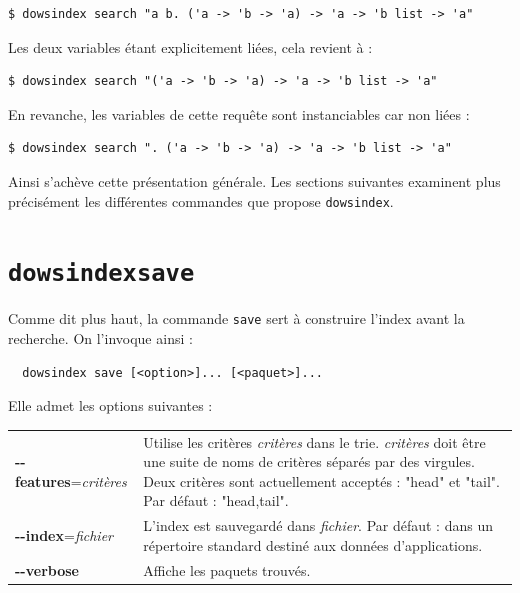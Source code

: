 \documentclass[a4paper]{report}
\theoremstyle{definition}
\newcommand{\dowsindex}{\texttt{dowsindex}\xspace}
\begin{document}
{\begin{verbatim}
$ dowsindex search "a b. ('a -> 'b -> 'a) -> 'a -> 'b list -> 'a"
\end{verbatim}

Les deux variables étant explicitement liées, cela revient à :

\begin{verbatim}
$ dowsindex search "('a -> 'b -> 'a) -> 'a -> 'b list -> 'a"
\end{verbatim}

En revanche, les variables de cette requête sont instanciables car non liées :

\begin{verbatim}
$ dowsindex search ". ('a -> 'b -> 'a) -> 'a -> 'b list -> 'a"
\end{verbatim}

Ainsi s'achève cette présentation générale. Les sections suivantes examinent plus précisément les différentes commandes que propose \dowsindex.


\section{\dowsindex \texttt{save}}

Comme dit plus haut, la commande \texttt{save} sert à construire l'index avant la recherche. On l'invoque ainsi :

\begin{center}
  \begin{verbatim}
  dowsindex save [<option>]... [<paquet>]...
  \end{verbatim}
\end{center}

Elle admet les options suivantes :

\begin{table}[h]
  \begin{tabularx}{\textwidth}{lX}
      \textbf{-{}-features}=\textit{critères} &
      Utilise les critères \textit{critères} dans le trie. \textit{critères} doit être une suite de noms de critères séparés par des virgules. Deux critères sont actuellement acceptés : "head" et "tail". Par défaut : "head,tail".
    \\
      \textbf{-{}-index}=\textit{fichier} &
      L'index est sauvegardé dans \textit{fichier}. Par défaut : dans un répertoire standard destiné aux données d'applications.
    \\
      \textbf{-{}-verbose} &
      Affiche les paquets trouvés.
  \end{tabularx}
\end{table}

}
\end{document}
